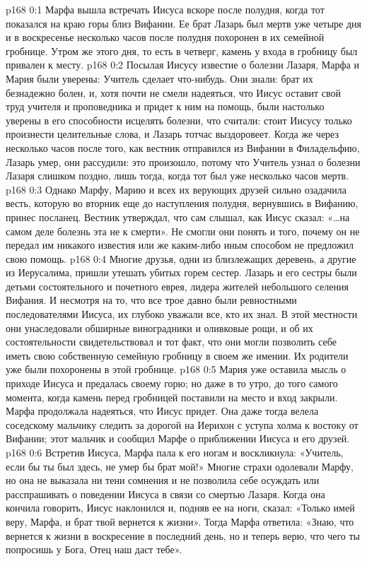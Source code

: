 \author{Комиссия срединников}
\vs p168 0:1 Марфа вышла встречать Иисуса вскоре после полудня, когда тот показался на краю горы близ Вифании. Ее брат Лазарь был мертв уже четыре дня и в воскресенье несколько часов после полудня похоронен в их семейной гробнице. Утром же этого дня, то есть в четверг, камень у входа в гробницу был привален к месту.
\vs p168 0:2 Посылая Иисусу известие о болезни Лазаря, Марфа и Мария были уверены: Учитель сделает что\hyp{}нибудь. Они знали: брат их безнадежно болен, и, хотя почти не смели надеяться, что Иисус оставит свой труд учителя и проповедника и придет к ним на помощь, были настолько уверены в его способности исцелять болезни, что считали: стоит Иисусу только произнести целительные слова, и Лазарь тотчас выздоровеет. Когда же через несколько часов после того, как вестник отправился из Вифании в Филадельфию, Лазарь умер, они рассудили: это произошло, потому что Учитель узнал о болезни Лазаря слишком поздно, лишь тогда, когда тот был уже несколько часов мертв.
\vs p168 0:3 Однако Марфу, Марию и всех их верующих друзей сильно озадачила весть, которую во вторник еще до наступления полудня, вернувшись в Вифанию, принес посланец. Вестник утверждал, что сам слышал, как Иисус сказал: «\ldots на самом деле болезнь эта не к смерти». Не смогли они понять и того, почему он не передал им никакого известия или же каким\hyp{}либо иным способом не предложил свою помощь.
\vs p168 0:4 Многие друзья, одни из близлежащих деревень, а другие из Иерусалима, пришли утешать убитых горем сестер. Лазарь и его сестры были детьми состоятельного и почетного еврея, лидера жителей небольшого селения Вифания. И несмотря на то, что все трое давно были ревностными последователями Иисуса, их глубоко уважали все, кто их знал. В этой местности они унаследовали обширные виноградники и оливковые рощи, и об их состоятельности свидетельствовал и тот факт, что они могли позволить себе иметь свою собственную семейную гробницу в своем же имении. Их родители уже были похоронены в этой гробнице.
\vs p168 0:5 Мария уже оставила мысль о приходе Иисуса и предалась своему горю; но даже в то утро, до того самого момента, когда камень перед гробницей поставили на место и вход закрыли. Марфа продолжала надеяться, что Иисус придет. Она даже тогда велела соседскому мальчику следить за дорогой на Иерихон с уступа холма к востоку от Вифании; этот мальчик и сообщил Марфе о приближении Иисуса и его друзей.
\vs p168 0:6 Встретив Иисуса, Марфа пала к его ногам и воскликнула: «Учитель, если бы ты был здесь, не умер бы брат мой!» Многие страхи одолевали Марфу, но она не выказала ни тени сомнения и не позволила себе осуждать или расспрашивать о поведении Иисуса в связи со смертью Лазаря. Когда она кончила говорить, Иисус наклонился и, подняв ее на ноги, сказал: «Только имей веру, Марфа, и брат твой вернется к жизни». Тогда Марфа ответила: «Знаю, что вернется к жизни в воскресение в последний день, но и теперь верю, что чего ты попросишь у Бога, Отец наш даст тебе».
